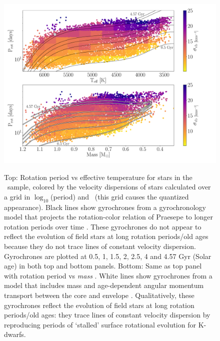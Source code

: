 \begin{figure}
  \caption{
    Top: Rotation period vs effective temperature for stars in the \mct\
    sample, colored by the velocity dispersions of stars calculated over a
    grid in $\log_{10}$(period) and \teff\ (this grid causes the quantized
    appearance).
    Black lines show gyrochrones from a gyrochronology model that projects the
    rotation-color relation of
    Praesepe to longer rotation periods over time \citep{angus2019}.
    These gyrochrones do not appear to reflect the evolution of field stars at
    long rotation periods/old ages because they do not trace lines of constant
    velocity dispersion.
    Gyrochrones are plotted at 0.5, 1, 1.5, 2, 2.5, 4 and 4.57 Gyr (Solar age)
    in both top and bottom panels.
    Bottom: Same as top panel with rotation period vs {\it mass}
    \citep[from][]{berger2020}.
    White lines show gyrochrones from a model that includes mass and
    age-dependent angular momentum transport between the core and envelope
    \citep{spada2019}.
    Qualitatively, these gyrochrones reflect the evolution of field
    stars at long rotation periods/old ages: they trace lines of constant
    velocity dispersion by reproducing periods of `stalled' surface rotational
    evolution for K-dwarfs.
}
  \centering
    \includegraphics[width=1\textwidth]{main_figure}
\label{fig:vplot}
\end{figure}

